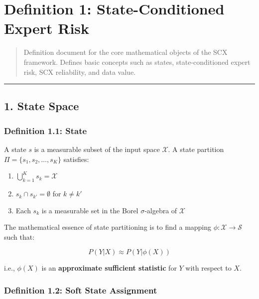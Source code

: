 \documentclass[
  12pt,
]{ctexart}
\author{SCX}
\date{2026}
\providecommand{\tightlist}{%
  \setlength{\itemsep}{0pt}\setlength{\parskip}{0pt}}
\begin{document}
\section{Definition 1: State-Conditioned Expert
Risk}\label{definition-1-state-conditioned-expert-risk}

\begin{quote}
Definition document for the core mathematical objects of the SCX framework. Defines basic concepts such as states, state-conditioned expert risk, SCX reliability, and data value.
\end{quote}

\begin{center}\rule{0.5\linewidth}{0.5pt}\end{center}

\subsection{1. State Space}\label{state-space}

\subsubsection{Definition 1.1: State}\label{definition-1.1-state}

A state \(s\) is a measurable subset of the input space \(\mathcal{X}\). A state partition
\(\Pi = \{s_1, s_2, \dots, s_K\}\) satisfies:

\begin{enumerate}
\def\labelenumi{\arabic{enumi}.}
\tightlist
\item
  \(\bigcup_{k=1}^K s_k = \mathcal{X}\)
\item
  \(s_k \cap s_{k'} = \emptyset\) for \(k \neq k'\)
\item
  Each \(s_k\) is a measurable set in the Borel \(\sigma\)-algebra of \(\mathcal{X}\)
\end{enumerate}

The mathematical essence of state partitioning is to find a mapping
\(\phi: \mathcal{X} \to \mathcal{S}\) such that:

\[P(Y|X) \approx P(Y|\phi(X))\]

i.e., \(\phi(X)\) is an \textbf{approximate sufficient statistic} for \(Y\) with respect to \(X\).

\subsubsection{Definition 1.2: Soft State Assignment}\label{definition-1.2-soft-state-assignment}
\end{document}
